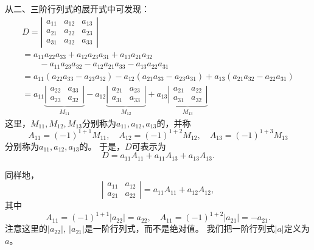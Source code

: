 \begin{frame}
从二、三阶行列式的展开式中可发现：
$$
\begin{array}{l}
  D  =  \left|
  \begin{array}{ccc}
    a_{11} & a_{12} & a_{13}\\
    a_{21} & a_{22} & a_{23}\\
    a_{31} & a_{32} & a_{33}
  \end{array}
                      \right| \\[0.6cm]
  = 
  a_{11}a_{22}a_{33}+a_{12}a_{23}a_{31}+a_{13}a_{21}a_{32} \\[0.3cm] 
  \qquad -a_{11}a_{23}a_{32}-a_{12}a_{21}a_{33}-a_{13}a_{22}a_{31} \\[0.3cm] 
  = 
  a_{11}(a_{22}a_{33}-a_{23}a_{32})-
  a_{12}(a_{21}a_{33}-a_{23}a_{31})+
  a_{13}(a_{21}a_{32}-a_{22}a_{31}) \\[0.3cm] 
  = 
  a_{11} \underbrace{\left| \begin{array}{ccc} a_{22} & a_{33} \\ a_{23} & a_{32} \end{array} \right|}_{M_{11}} -
                                                                           a_{12} \underbrace{\left| \begin{array}{ccc} a_{21} & a_{23} \\ a_{31} & a_{33} \end{array} \right|}_{M_{12}} +
                                                                                                                                                    a_{13} \underbrace{\left| \begin{array}{ccc} a_{21} & a_{22} \\ a_{31} & a_{32} \end{array} \right|}_{M_{13}}
\end{array}
$$
这里，$M_{11},M_{12},M_{13}$分别称为$a_{11},a_{12},a_{13}$的，并称
$$
A_{11} = (-1)^{1+1} M_{11}, \quad
A_{12} = (-1)^{1+2} M_{12}, \quad
A_{13} = (-1)^{1+3} M_{13}
$$
分别称为$a_{11},a_{12},a_{13}$的。 于是，$D$可表示为
$$
D= a_{11}A_{11} + a_{11}A_{13} + a_{13}A_{13}.
$$
\end{frame}

\begin{frame}



同样地，
$$
  \left| \begin{array}{ccc} a_{11} & a_{12} \\ a_{21} & a_{22} \end{array} \right|
= a_{11} A_{11} + a_{12} A_{12},
$$
其中
$$
A_{11} = (-1)^{1+1}|a_{22}| =  a_{22},\quad
A_{11} = (-1)^{1+2}|a_{21}| = -a_{21}.
$$
注意这里的$|a_{22}|,~|a_{21}|$是一阶行列式，而不是绝对值。
我们把一阶行列式$|a|$定义为$a$。
%
\end{frame}


